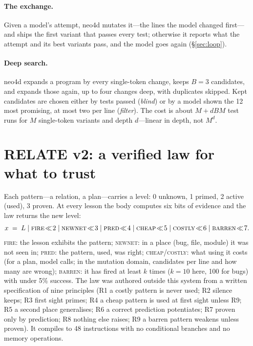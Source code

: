 \documentclass[10pt]{article}
\begin{document}
\paragraph{The exchange.} Given a model's attempt, neo4d mutates it---the lines the model changed first---and ships the
first variant that passes every test; otherwise it reports what the attempt and its best variants pass, and the model
goes again (\S\ref{sec:loop}).

\paragraph{Deep search.} neo4d expands a program by every single-token change, keeps $B=3$ candidates, and expands
those again, up to four changes deep, with duplicates skipped. Kept candidates are chosen either by tests passed
(\emph{blind}) or by a model shown the 12 most promising, at most two per line (\emph{filter}). The cost is about
$M + dBM$ test runs for $M$ single-token variants and depth $d$---linear in depth, not $M^d$.

\section{RELATE v2: a verified law for what to trust}
\label{sec:law}

Each pattern---a relation, a plan---carries a level: 0 unknown, 1 primed, 2 active (used), 3 proven. At every lesson
the body computes six bits of evidence and the law returns the new level:
\[
x \;=\; L \;|\; \textsc{fire}\!\ll\!2 \;|\; \textsc{newnet}\!\ll\!3 \;|\; \textsc{pred}\!\ll\!4 \;|\; \textsc{cheap}\!\ll\!5 \;|\; \textsc{costly}\!\ll\!6 \;|\; \textsc{barren}\!\ll\!7 .
\]
\textsc{fire}: the lesson exhibits the pattern; \textsc{newnet}: in a place (bug, file, module) it was not seen in;
\textsc{pred}: the pattern, used, was right; \textsc{cheap}/\textsc{costly}: what using it costs (for a plan, model
calls; in the mutation domain, candidates per line and how many are wrong); \textsc{barren}: it has fired at least
$k$ times ($k=10$ here, 100 for bugs) with under 5\% success. The law was authored outside this system from a written
specification of nine principles (R1 a costly pattern is never used; R2 silence keeps; R3 first sight primes; R4 a
cheap pattern is used at first sight unless R9; R5 a second place generalises; R6 a correct prediction potentiates;
R7 proven only by prediction; R8 nothing else raises; R9 a barren pattern weakens unless proven). It compiles to 48
instructions with no conditional branches and no memory operations.
\end{document}
